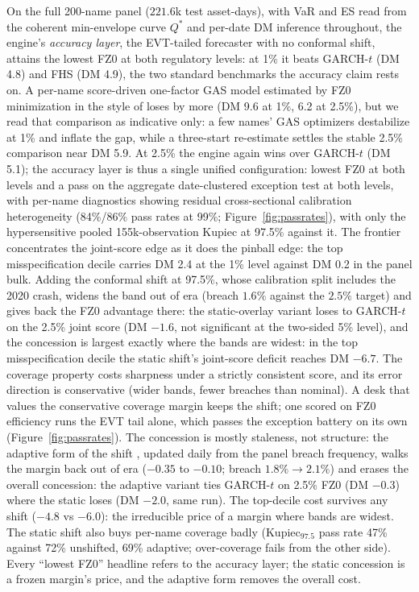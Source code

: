 \documentclass[11pt]{article}
\theoremstyle{remark}
\begin{document}
On the full 200-name
panel ($221.6$k test asset-days), with VaR and ES read from the
coherent min-envelope curve $Q^{*}$ and per-date DM inference
throughout, the engine's \emph{accuracy layer}, the EVT-tailed forecaster with no
conformal shift, attains the
lowest FZ0 at both regulatory levels: at 1\% it beats GARCH-$t$ (DM 4.8) and FHS (DM 4.9), the two standard
benchmarks the accuracy claim rests on. A per-name score-driven
one-factor GAS model estimated by FZ0 minimization in the style of
\citet{patton2019} loses by more (DM 9.6 at 1\%, 6.2 at 2.5\%), but we
read that comparison as indicative only: a few names' GAS optimizers
destabilize at 1\% and inflate the gap, while a three-start re-estimate
settles the stable 2.5\% comparison near DM 5.9. At 2.5\% the engine
again wins over GARCH-$t$ (DM 5.1); the accuracy layer is thus a single
unified configuration: lowest FZ0 at both
levels and a pass on the aggregate date-clustered exception
test at both levels, with per-name diagnostics showing residual
cross-sectional calibration heterogeneity (84\%/86\% pass rates at
99\%; Figure~\ref{fig:passrates}),
with only the hypersensitive pooled 155k-observation Kupiec at 97.5\%
against it. The frontier concentrates the joint-score
edge as it does the pinball edge: the top misspecification decile
carries DM 2.4 at the 1\% level against DM 0.2 in the panel bulk.
Adding the conformal shift at 97.5\%, whose calibration split includes
the 2020 crash, widens the band out of era (breach $1.6\%$ against the $2.5\%$ target) and gives
back the FZ0 advantage there: the static-overlay variant loses to
GARCH-$t$ on the 2.5\% joint score (DM $-1.6$, not significant at
the two-sided 5\% level), and the concession is largest exactly where
the bands are widest: in the top misspecification decile the
static shift's joint-score deficit reaches DM $-6.7$. The coverage
property costs sharpness under
a strictly consistent score, and its error direction is conservative
(wider bands, fewer breaches than nominal). A desk that values the
conservative coverage margin keeps the shift; one scored on FZ0
efficiency
runs the EVT tail alone, which passes the exception battery on its
own (Figure~\ref{fig:passrates}). The concession is
mostly staleness, not structure: the adaptive form of the
shift \citep{gibbs2021aci}, updated daily from the panel breach
frequency, walks the margin back out of era ($-0.35$ to $-0.10$;
breach $1.8\%\to2.1\%$) and erases the overall concession: the
adaptive variant ties GARCH-$t$ on 2.5\% FZ0 (DM $-0.3$) where the
static loses (DM $-2.0$, same run). The top-decile cost survives any
shift ($-4.8$ vs $-6.0$): the irreducible price of a margin where
bands are widest. The static shift also buys per-name coverage badly
(Kupiec$_{97.5}$ pass rate 47\% against 72\% unshifted, 69\%
adaptive; over-coverage fails from the other side). Every
``lowest FZ0'' headline refers to the accuracy layer; the static
concession is a frozen margin's price, and the adaptive form removes
the overall cost.
\end{document}
